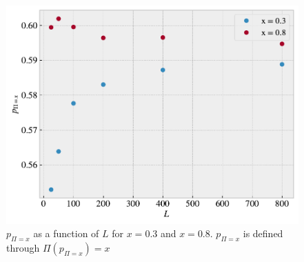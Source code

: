 \documentclass[reprint, amsmath, amssymb, aps]{revtex4-2}
\begin{document}
\begin{figure}[H]
  \includegraphics[width=\linewidth]{figures/l.pdf}
  \caption{$p_{\Pi = x}$ as a function of $L$ for $x=0.3$ and $x=0.8$. $p_{\Pi = x}$ is defined through $\Pi(p_{\Pi = x}) = x$ }
  \label{fig:l}
\end{figure}
%
%
\end{document}
